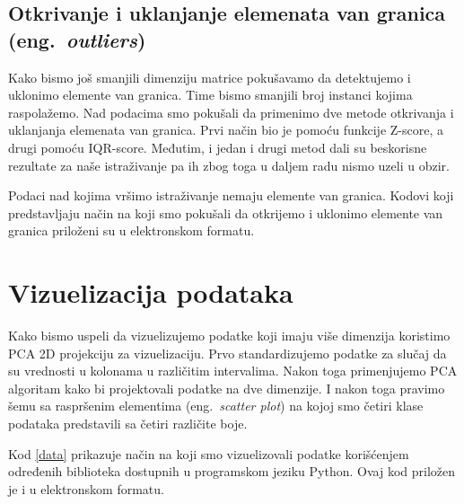 \documentclass[a4paper]{article}
\begin{document}
\subsection{Otkrivanje i uklanjanje elemenata van granica (eng.~{\em outliers})}
Kako bismo još smanjili dimenziju matrice pokušavamo da detektujemo i uklonimo elemente van granica. Time bismo smanjili broj instanci kojima raspolažemo. Nad podacima smo pokušali da primenimo dve metode otkrivanja i uklanjanja elemenata van granica. Prvi način bio je pomoću funkcije Z-score, a drugi pomoću IQR-score. Međutim, i jedan i drugi metod dali su beskorisne rezultate za naše istraživanje pa ih zbog toga u daljem radu nismo uzeli u obzir. 

Podaci nad kojima vršimo istraživanje nemaju elemente van granica. Kodovi koji predstavljaju način na koji smo pokušali da otkrijemo i uklonimo elemente van granica priloženi su u elektronskom formatu.

\section{Vizuelizacija podataka}
\label{sec:vezuelizacija}

Kako bismo uspeli da vizuelizujemo podatke koji imaju više dimenzija koristimo PCA 2D projekciju za vizuelizaciju. Prvo standardizujemo podatke za slučaj da su vrednosti u kolonama u različitim intervalima. Nakon toga primenjujemo PCA algoritam kako bi projektovali podatke na dve dimenzije. I nakon toga pravimo šemu sa raspršenim elementima (eng.~{\em scatter plot}) na kojoj smo četiri klase podataka predstavili sa četiri različite boje.

Kod \ref{data} prikazuje način na koji smo vizuelizovali podatke korišćenjem određenih biblioteka dostupnih u programskom jeziku Python. Ovaj kod priložen je i u elektronskom formatu.
\\
\end{document}
